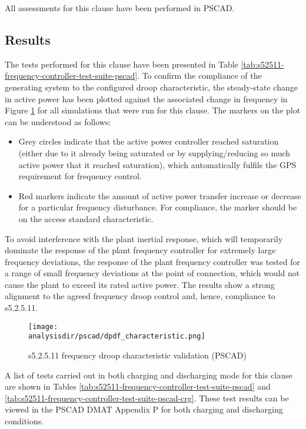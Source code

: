 \documentclass{../grid-link-report}
\newcommand{\analysisdir}{report-assets/analysis}
\begin{document}
		All assessments for this clause have been performed in PSCAD.
		
	\subsection{Results}
	The tests performed for this clause have been presented in Table \ref{tab:s52511-frequency-controller-test-suite-pscad}. To confirm the compliance of the generating system to the configured droop characteristic, the steady-state change in active power has been plotted against the associated change in frequency in Figure \ref{fig:52511-frequency-droop-validation-pscad} for all simulations that were run for this clause. The markers on the plot can be understood as follows:
	
	\begin{itemize}
		\item Grey circles indicate that the active power controller reached saturation (either due to it already being saturated or by supplying/reducing so much active power that it reached saturation), which automatically fulfils the GPS requirement for frequency control.
		\item Red markers indicate the amount of active power transfer increase or decrease for a particular frequency disturbance. For compliance, the marker should be on the access standard characteristic.
	\end{itemize}
	
	To avoid interference with the plant inertial response, which will temporarily dominate the response of the plant frequency controller for extremely large frequency deviations, the response of the plant frequency controller was tested for a range of small frequency deviations at the point of connection, which would not cause the plant to exceed its rated active power. The results show a strong alignment to the agreed frequency droop control and, hence, compliance to s5.2.5.11.
	
	\begin{figure}[H]
		\centering
		\texttt{[image: \\analysisdir/pscad/dpdf\_characteristic.png]}
		\caption{s5.2.5.11 frequency droop characteristic validation (PSCAD)}
		\label{fig:52511-frequency-droop-validation-pscad}
	\end{figure}
	
	A list of tests carried out in both charging and discharging mode for this clause are shown in Tables \ref{tab:s52511-frequency-controller-test-suite-pscad} and \ref{tab:s52511-frequency-controller-test-suite-pscad-crg}. These test results can be viewed in the PSCAD DMAT Appendix P for both charging and discharging conditions.
	
\end{document}
